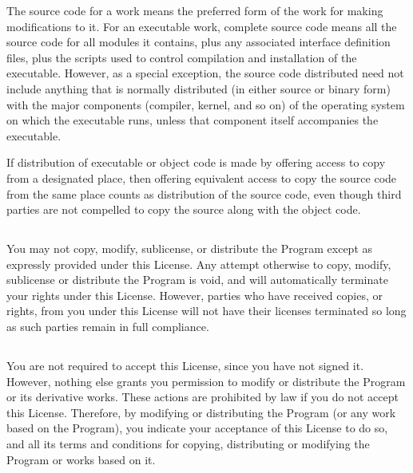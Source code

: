 \documentclass[a4paper, 12pt]{article}
\begin{document}
\vspace{0.3cm}

The source code for a work means the preferred form of the work for making modifications to it. For an executable work, complete source code means all the source code for all modules it contains, plus any associated interface definition files, plus the scripts used to control compilation and installation of the executable. However, as a special exception, the source code distributed need not include anything that is normally distributed (in either source or binary form) with the major components (compiler, kernel, and so on) of the operating system on which the executable runs, unless that component itself accompanies the executable.

\vspace{0.3cm}

If distribution of executable or object code is made by offering access to copy from a designated place, then offering equivalent access to copy the source code from the same place counts as distribution of the source code, even though third parties are not compelled to copy the source along with the object code.

\subsection{}

You may not copy, modify, sublicense, or distribute the Program except as expressly provided under this License. Any attempt otherwise to copy, modify, sublicense or distribute the Program is void, and will automatically terminate your rights under this License. However, parties who have received copies, or rights, from you under this License will not have their licenses terminated so long as such parties remain in full compliance.

\subsection{}

You are not required to accept this License, since you have not signed it. However, nothing else grants you permission to modify or distribute the Program or its derivative works. These actions are prohibited by law if you do not accept this License. Therefore, by modifying or distributing the Program (or any work based on the Program), you indicate your acceptance of this License to do so, and all its terms and conditions for copying, distributing or modifying the Program or works based on it.
\end{document}
